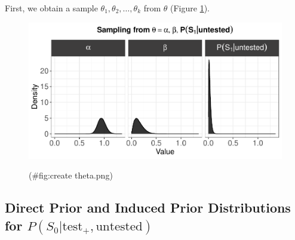 \documentclass[12pt,twoside]{smiththesis}
\begin{document}
First, we obtain a sample \(\theta_1, \theta_2, \dots, \theta_k\) from \(\theta\) (Figure \ref{fig:theta}).
\begin{figure}

{\centering \includegraphics[width=1\linewidth]{thesis_files/figure-latex/create theta.png-1} 

}

\caption{\label{fig:theta}}(\#fig:create theta.png)
\end{figure}
\hypertarget{direct-prior-and-induced-prior-distributions-for-ps_0texttest_textuntested}{%
\subsection{\texorpdfstring{Direct Prior and Induced Prior Distributions for \(P(S_0|\text{test}_+,\text{untested})\)}{Direct Prior and Induced Prior Distributions for P(S\_0\textbar\textbackslash text\{test\}\_+,\textbackslash text\{untested\})}}\label{direct-prior-and-induced-prior-distributions-for-ps_0texttest_textuntested}}
\end{document}
